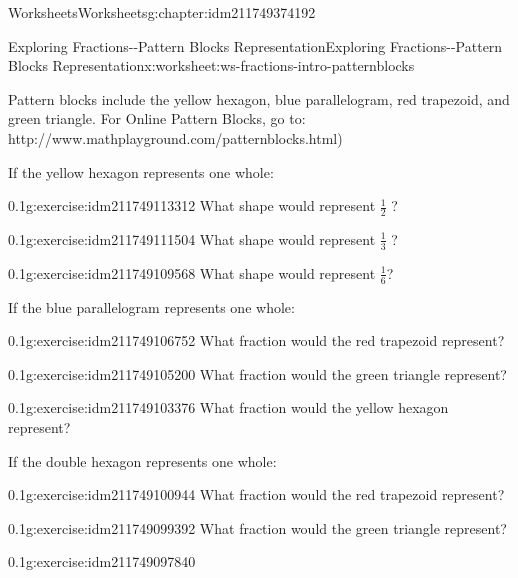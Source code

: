 \documentclass[twoside,11pt,]{book}
\begin{document}
\begin{chapterptx}{Worksheets}{}{Worksheets}{}{}{g:chapter:idm211749374192}
\begin{worksheet-section-numberless}{Exploring Fractions-{}-{}Pattern Blocks Representation}{}{Exploring Fractions-{}-{}Pattern Blocks Representation}{}{}{x:worksheet:ws-fractions-intro-patternblocks}
\begin{introduction}{}
Pattern blocks include the yellow hexagon, blue parallelogram, red trapezoid, and green triangle. For Online Pattern Blocks, go to: http:\slash{}\slash{}www.mathplayground.com\slash{}patternblocks.html)%
\end{introduction}%
\begin{introduction}{}%
If the yellow hexagon represents one whole:%
\end{introduction}%
\begin{divisionexercise}{1}{}{0.1}{g:exercise:idm211749113312}%
What shape would represent \(\frac{1}{2} \) ?%
\end{divisionexercise}%
\begin{divisionexercise}{2}{}{0.1}{g:exercise:idm211749111504}%
What shape would represent \(\frac{1}{3} \) ?%
\end{divisionexercise}%
\begin{divisionexercise}{3}{}{0.1}{g:exercise:idm211749109568}%
What shape would represent \(\frac{1}{6} \)?%
\end{divisionexercise}%
\begin{introduction}{}%
If the blue parallelogram represents one whole:%
\end{introduction}%
\begin{divisionexercise}{4}{}{0.1}{g:exercise:idm211749106752}%
What fraction would the red trapezoid represent?%
\end{divisionexercise}%
\begin{divisionexercise}{5}{}{0.1}{g:exercise:idm211749105200}%
What fraction would the green triangle represent?%
\end{divisionexercise}%
\clearpage
\begin{divisionexercise}{6}{}{0.1}{g:exercise:idm211749103376}%
What fraction would the yellow hexagon represent?%
\end{divisionexercise}%
\begin{introduction}{}%
If the double hexagon represents one whole:%
\end{introduction}%
\begin{divisionexercise}{7}{}{0.1}{g:exercise:idm211749100944}%
What fraction would the red trapezoid represent?%
\end{divisionexercise}%
\begin{divisionexercise}{8}{}{0.1}{g:exercise:idm211749099392}%
What fraction would the green triangle represent?%
\end{divisionexercise}%
\begin{divisionexercise}{9}{}{0.1}{g:exercise:idm211749097840}%

\end{divisionexercise}
\end{worksheet-section-numberless}
\end{chapterptx}
\end{document}
